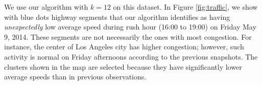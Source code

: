 We use our algorithm with $k=12$ on this dataset. In Figure \ref{fig:traffic}, we show with blue dots highway segments that our algorithm identifies as having \emph{unexpectedly} low average speed during rush hour (16:00 to 19:00) on Friday May 9, 2014. These segments are not necessarily the ones with most congestion. For instance, the center of Los Angeles city has higher congestion; however, such activity is normal on Friday afternoons according to the previous snapshots. The clusters shown in the map are selected because they have significantly lower average speeds than in previous observations.  


  

